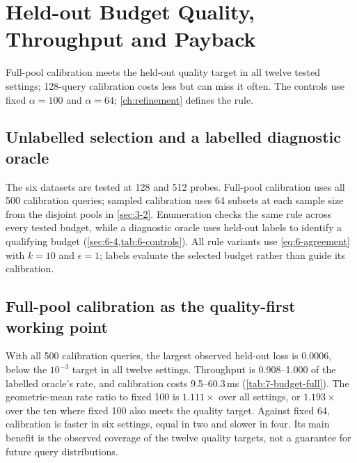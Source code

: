 \section{Held-out Budget Quality, Throughput and Payback}
\label{sec:7-5}

Full-pool calibration meets the held-out quality target in all twelve
tested settings; 128-query calibration costs less but can miss it often.
The controls use fixed
$\alpha=100$ and $\alpha=64$; \cref{ch:refinement} defines the rule.

\subsection{Unlabelled selection and a labelled diagnostic oracle}

The six datasets are tested at 128 and 512 probes. Full-pool calibration
uses all 500 calibration queries; sampled calibration uses 64 subsets at
each sample size from the disjoint pools in \cref{sec:3-2}. Enumeration
checks the same rule across every tested budget, while a diagnostic
oracle uses held-out labels to identify a qualifying budget
(\cref{sec:6-4,tab:6-controls}). All rule variants use
\cref{eq:6-agreement} with $k=10$ and $\epsilon=1$; labels evaluate the
selected budget rather than guide its calibration.

\subsection{Full-pool calibration as the quality-first working point}

With all 500 calibration queries, the largest observed held-out loss
is 0.0006, below the $10^{-3}$ target in all twelve settings.
Throughput is 0.908--1.000 of the labelled oracle's rate, and calibration
costs 9.5--60.3\,ms (\cref{tab:7-budget-full}). The geometric-mean rate
ratio to fixed 100 is $1.111\times$ over all settings, or
$1.193\times$ over the ten where fixed 100 also meets the quality target.
Against fixed 64, calibration is faster in six settings, equal in two
and slower in four. Its main benefit is the observed coverage of the
twelve quality targets, not a guarantee for future query distributions.

\begin{table}[!htbp]
\centering
\caption[Full-pool budget calibration]{Full-pool calibration ($S=500$). Loss is relative to the best
measured held-out recall; rates are kQPS from the selected fixed budget.
``Cal.'' is one full-pool calibration call per setting, not a repeated
stream timing. Held-out counts are 500, or 499 for Stella.}
\label{tab:7-budget-full}
\footnotesize\setlength{\tabcolsep}{3pt}

\end{table}

